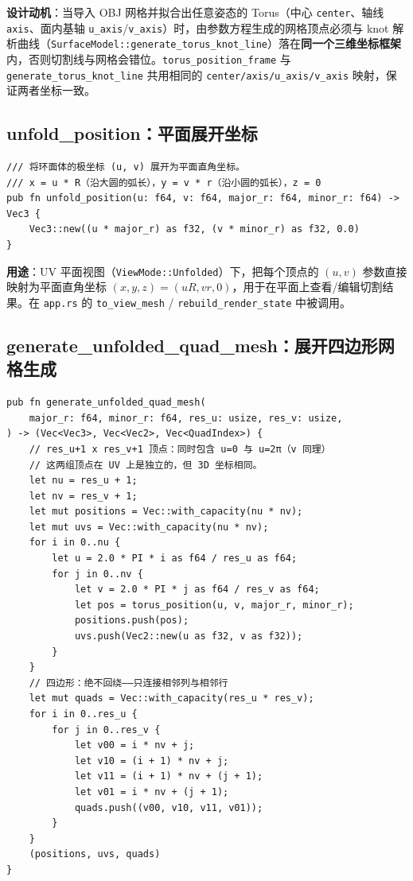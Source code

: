 \documentclass[12pt,a4paper]{article}
\begin{document}
\textbf{设计动机}：当导入 OBJ 网格并拟合出任意姿态的 Torus（中心 \texttt{center}、轴线 \texttt{axis}、面内基轴 \texttt{u\_axis}/\texttt{v\_axis}）时，由参数方程生成的网格顶点必须与 knot 解析曲线（\texttt{SurfaceModel::generate\_torus\_knot\_line}）落在\textbf{同一个三维坐标框架}内，否则切割线与网格会错位。\texttt{torus\_position\_frame} 与 \texttt{generate\_torus\_knot\_line} 共用相同的 \texttt{center/axis/u\_axis/v\_axis} 映射，保证两者坐标一致。

\subsection{unfold\_position：平面展开坐标}

\begin{lstlisting}[]
/// 将环面体的极坐标 (u, v) 展开为平面直角坐标。
/// x = u * R（沿大圆的弧长），y = v * r（沿小圆的弧长），z = 0
pub fn unfold_position(u: f64, v: f64, major_r: f64, minor_r: f64) -> Vec3 {
    Vec3::new((u * major_r) as f32, (v * minor_r) as f32, 0.0)
}
\end{lstlisting}

\textbf{用途}：UV 平面视图（\texttt{ViewMode::Unfolded}）下，把每个顶点的 $(u,v)$ 参数直接映射为平面直角坐标 $(x,y,z)=(uR, vr, 0)$，用于在平面上查看/编辑切割结果。在 \texttt{app.rs} 的 \texttt{to\_view\_mesh} / \texttt{rebuild\_render\_state} 中被调用。

\subsection{generate\_unfolded\_quad\_mesh：展开四边形网格生成}

\begin{lstlisting}[]
pub fn generate_unfolded_quad_mesh(
    major_r: f64, minor_r: f64, res_u: usize, res_v: usize,
) -> (Vec<Vec3>, Vec<Vec2>, Vec<QuadIndex>) {
    // res_u+1 x res_v+1 顶点：同时包含 u=0 与 u=2π（v 同理）
    // 这两组顶点在 UV 上是独立的，但 3D 坐标相同。
    let nu = res_u + 1;
    let nv = res_v + 1;
    let mut positions = Vec::with_capacity(nu * nv);
    let mut uvs = Vec::with_capacity(nu * nv);
    for i in 0..nu {
        let u = 2.0 * PI * i as f64 / res_u as f64;
        for j in 0..nv {
            let v = 2.0 * PI * j as f64 / res_v as f64;
            let pos = torus_position(u, v, major_r, minor_r);
            positions.push(pos);
            uvs.push(Vec2::new(u as f32, v as f32));
        }
    }
    // 四边形：绝不回绕——只连接相邻列与相邻行
    let mut quads = Vec::with_capacity(res_u * res_v);
    for i in 0..res_u {
        for j in 0..res_v {
            let v00 = i * nv + j;
            let v10 = (i + 1) * nv + j;
            let v11 = (i + 1) * nv + (j + 1);
            let v01 = i * nv + (j + 1);
            quads.push((v00, v10, v11, v01));
        }
    }
    (positions, uvs, quads)
}
\end{lstlisting}
\end{document}
